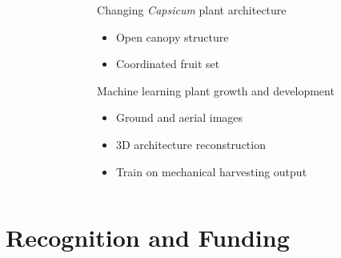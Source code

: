 \documentclass[11pt, aspectratio=169]{beamer}
\begin{document}
{\begin{columns}
\begin{column}{0.5\linewidth}
  \end{column}
  \begin{column}{0.5\linewidth}
  
  Changing \emph{Capsicum} plant architecture
  \begin{itemize}
    \item Open canopy structure
    \item Coordinated fruit set
  \end{itemize}
\vspace{5mm}
  Machine learning plant growth and development
  \begin{itemize}
    \item Ground and aerial images
    \item 3D architecture reconstruction
    \item Train on mechanical harvesting output
  \end{itemize}
  \end{column}
  \end{columns}

  }

\section{Recognition and Funding}
\end{document}
